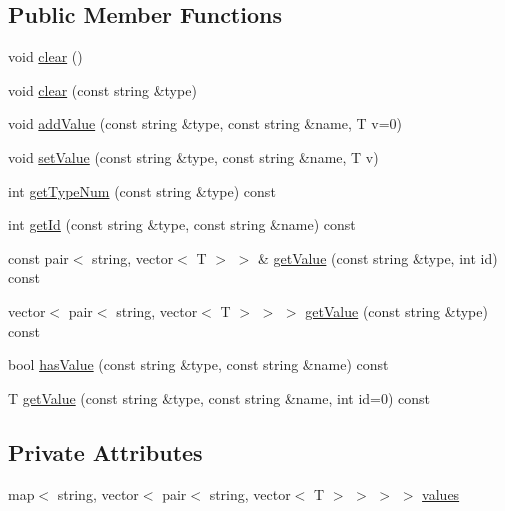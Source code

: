 \subsection*{Public Member Functions}
\begin{DoxyCompactItemize}
\item 
void \mbox{\hyperlink{classgraphsat_1_1_value_data_a01ec9ee50f85bff7eaa5a29e2b5c7d53}{clear}} ()
\item 
void \mbox{\hyperlink{classgraphsat_1_1_value_data_a6601a601e64ad58e8d584226a13771e7}{clear}} (const string \&type)
\item 
void \mbox{\hyperlink{classgraphsat_1_1_value_data_a96406cf8892e187bc37fccb5c8f5f130}{add\+Value}} (const string \&type, const string \&name, T v=0)
\item 
void \mbox{\hyperlink{classgraphsat_1_1_value_data_a5a2ec95b007418d2c4278d68b4b567d6}{set\+Value}} (const string \&type, const string \&name, T v)
\item 
int \mbox{\hyperlink{classgraphsat_1_1_value_data_ab6782ef0d92876cb39ea1a8bf2d486c6}{get\+Type\+Num}} (const string \&type) const
\item 
int \mbox{\hyperlink{classgraphsat_1_1_value_data_a08fe1d8569af3f9e0b4906528c527339}{get\+Id}} (const string \&type, const string \&name) const
\item 
const pair$<$ string, vector$<$ T $>$ $>$ \& \mbox{\hyperlink{classgraphsat_1_1_value_data_a393f4c36450ba089b2b19a39f1094bf3}{get\+Value}} (const string \&type, int id) const
\item 
vector$<$ pair$<$ string, vector$<$ T $>$ $>$ $>$ \mbox{\hyperlink{classgraphsat_1_1_value_data_a7214b99af7ad307d0f253a6440d451b3}{get\+Value}} (const string \&type) const
\item 
bool \mbox{\hyperlink{classgraphsat_1_1_value_data_a27fa3eb0807a8822cf2fb0262d93b14b}{has\+Value}} (const string \&type, const string \&name) const
\item 
T \mbox{\hyperlink{classgraphsat_1_1_value_data_a072e3aefea03ed89f7dc2b656d4dc62c}{get\+Value}} (const string \&type, const string \&name, int id=0) const
\end{DoxyCompactItemize}
\subsection*{Private Attributes}
\begin{DoxyCompactItemize}
\item 
map$<$ string, vector$<$ pair$<$ string, vector$<$ T $>$ $>$ $>$ $>$ \mbox{\hyperlink{classgraphsat_1_1_value_data_a896ab3d64dda9a631d60e0dca55ad90e}{values}}
\end{DoxyCompactItemize}


